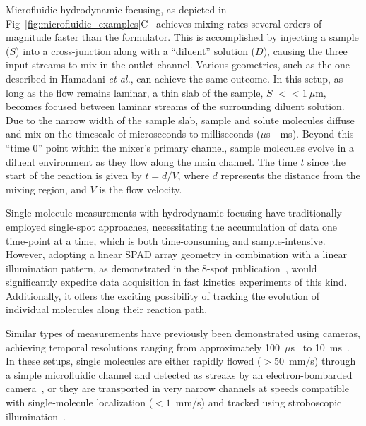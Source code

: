 Microfluidic hydrodynamic focusing, as depicted in Fig~\ref{fig:microfluidic_examples}C~\cite{knight_PRL_1998,lipman_science_2003,gambin_LoC_2010,wunderlich_NP_2013} achieves mixing rates several orders of magnitude faster than the formulator. 
This is accomplished by injecting a sample ($S$) into a cross-junction along with a \enquote{diluent} solution ($D$), causing the three input streams to mix in the outlet channel. 
Various geometries, such as the one described in Hamadani \textit{et al.}\cite{hamadani_BJ_2008}, can achieve the same outcome. 
In this setup, as long as the flow remains laminar, a thin slab of the sample, $S$ $<<1~\mu$m, becomes focused between laminar streams of the surrounding diluent solution. 
Due to the narrow width of the sample slab, sample and solute molecules diffuse and mix on the timescale of microseconds to milliseconds ($\mu$s - ms). 
Beyond this \enquote{time 0} point within the mixer's primary channel, sample molecules evolve in a diluent environment as they flow along the main channel. 
The time $t$ since the start of the reaction is given by $t = d/V$, where $d$ represents the distance from the mixing region, and $V$ is the flow velocity.

Single-molecule measurements with hydrodynamic focusing have traditionally employed single-spot approaches, necessitating the accumulation of data one time-point at a time, which is both time-consuming and sample-intensive. 
However, adopting a linear \ac{SPAD} array geometry in combination with a linear illumination pattern, as demonstrated in the 8-spot publication~\cite{ingargiola_SPIE_2017}, would significantly expedite data acquisition in fast kinetics experiments of this kind. 
Additionally, it offers the exciting possibility of tracking the evolution of individual molecules along their reaction path.

Similar types of measurements have previously been demonstrated using cameras, achieving temporal resolutions ranging from approximately 100~$\mu$s~\cite{oikawa_SR_2013,oikawa_JPCB_2015} to 10~ms~\cite{fontana_LoC_2019}. 
In these setups, single molecules are either rapidly flowed ($>50$~mm/s) through a simple microfluidic channel and detected as streaks by an electron-bombarded camera~\cite{oikawa_SR_2013,oikawa_JPCB_2015}, or they are transported in very narrow channels at speeds compatible with single-molecule localization ($<1$~mm/s) and tracked using stroboscopic illumination~\cite{fontana_LoC_2019}.

